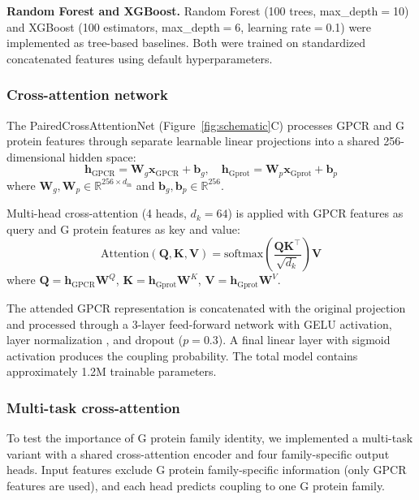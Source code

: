 \documentclass[11pt,a4paper]{article}
\begin{document}
\textbf{Random Forest and XGBoost.} Random Forest (100 trees, max\_depth$=$10) and XGBoost \cite{chen2016xgboost} (100 estimators, max\_depth$=$6, learning rate$=$0.1) were implemented as tree-based baselines. Both were trained on standardized concatenated features using default hyperparameters.

\subsubsection{Cross-attention network}

The PairedCrossAttentionNet (Figure~\ref{fig:schematic}C) processes GPCR and G protein features through separate learnable linear projections into a shared 256-dimensional hidden space:
\begin{equation}
\mathbf{h}_{\text{GPCR}} = \mathbf{W}_g \mathbf{x}_{\text{GPCR}} + \mathbf{b}_g, \quad
\mathbf{h}_{\text{Gprot}} = \mathbf{W}_p \mathbf{x}_{\text{Gprot}} + \mathbf{b}_p
\end{equation}
where $\mathbf{W}_g, \mathbf{W}_p \in \mathbb{R}^{256 \times d_{\text{in}}}$ and $\mathbf{b}_g, \mathbf{b}_p \in \mathbb{R}^{256}$.

Multi-head cross-attention (4 heads, $d_k = 64$) is applied with GPCR features as query and G protein features as key and value:
\begin{equation}
\text{Attention}(\mathbf{Q}, \mathbf{K}, \mathbf{V}) = \text{softmax}\left(\frac{\mathbf{Q}\mathbf{K}^\top}{\sqrt{d_k}}\right)\mathbf{V}
\end{equation}
where $\mathbf{Q} = \mathbf{h}_{\text{GPCR}}\mathbf{W}^Q$, $\mathbf{K} = \mathbf{h}_{\text{Gprot}}\mathbf{W}^K$, $\mathbf{V} = \mathbf{h}_{\text{Gprot}}\mathbf{W}^V$.

The attended GPCR representation is concatenated with the original projection and processed through a 3-layer feed-forward network with GELU activation, layer normalization \cite{ba2016layer}, and dropout ($p=0.3$). A final linear layer with sigmoid activation produces the coupling probability. The total model contains approximately 1.2M trainable parameters.

\subsubsection{Multi-task cross-attention}

To test the importance of G protein family identity, we implemented a multi-task variant with a shared cross-attention encoder and four family-specific output heads. Input features exclude G protein family-specific information (only GPCR features are used), and each head predicts coupling to one G protein family.
\end{document}
